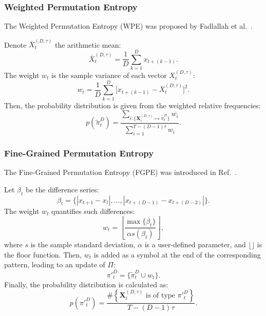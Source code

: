 \documentclass[journal]{IEEEtran}
\begin{document}
	\subsubsection{Weighted Permutation Entropy}\label{WPE}
	
	The Weighted Permutation Entropy (WPE) was proposed by Fadlallah et al.~\cite{Fadlallah2013Weightedpermutation}. 
	
	Denote $\overline{X}_t^{(D, \tau)}$ the arithmetic mean:
	\begin{equation}
	\overline{X}_t^{(D, \tau)} = \frac{1}{D} \sum_{k = 1}^{D} x_{t + (k - 1)}.
	\end{equation}
	The weight $w_{t}$ is the sample variance of each vector $X_t^{(D, \tau)}$:
	\begin{equation}
	w_{t} = \frac{1}{D} \sum_{k = 1}^{D}\big[x_{t + (k - 1)} - \overline{X}_t^{(D, \tau)}\big]^2 .
	\end{equation}
	Then, the probability distribution is given from the weighted relative frequencies:
	\begin{equation}
	p(\widetilde \pi_t^D) = \frac{\sum_{i : \{\mathbf{X}^{(D,\tau)}_i \mapsto \widetilde\pi^D_t\}} w_{i}}{\sum_{i = 1}^{T-(D-1)\tau} w_{i}}.
	\end{equation}
	
	\subsubsection{Fine-Grained Permutation Entropy}\label{FGPE}
	
	The Fine-Grained Permutation Entropy (FGPE) was introduced in Ref.~\cite{xiao2009fine}.
	
	Let $\beta_t$ be the difference series:
	\begin{equation}
	\beta_t = \big\{|x_{t+1} - x_t|, \dots, |x_{t+(D-1)} - x_{t+(D-2)}|\big\}.
	\end{equation}
	The weight $w_t$ quantifies such differences:
	\begin{equation}
	w_t = \left \lfloor \frac{\max\{\beta_t\}}{\alpha s(\beta_t) } \right \rfloor,
	\end{equation}
	where $s$ is the sample standard deviation,
	$\alpha$ is a user-defined parameter, 
	and $\lfloor \rfloor$ is the floor function.
	Then, $w_t$ is added as a symbol at the end of the corresponding pattern, leading to an update of $\Pi$:
	\begin{equation}
	\pi{'}_t^D = \{ \widetilde \pi_t^D \cup w_t\}.
	\end{equation} 
	Finally, the probability distribution is calculated as:
	\begin{equation}
	p(\pi{'}_t^D) = \frac{\#\left \{\mathbf{X}_t^{(D,\tau)} \text{ is of type } \pi{'}_t^D\right \}}{T- (D-1)\tau}.
	\end{equation}
	
\end{document}
